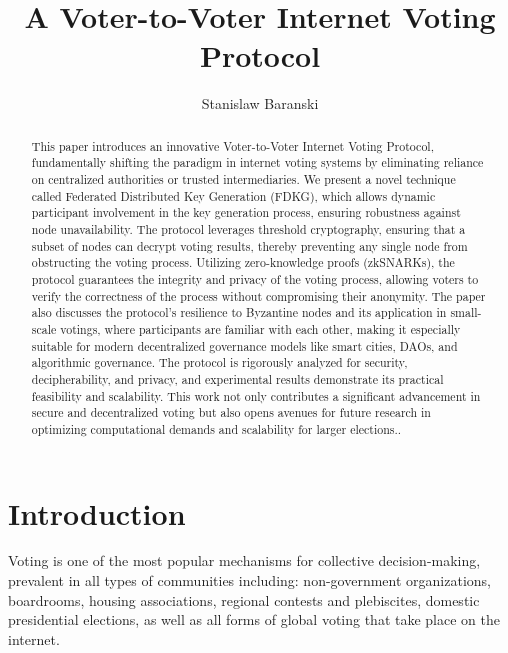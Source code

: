 \documentclass[runningheads]{llncs}
\title{A Voter-to-Voter Internet Voting Protocol}
\author{Stanislaw Baranski\inst{1}}
\institute{Gdansk University of Technology, Narutowicza 11/12 80-233, Gdansk, Poland \email{stanislaw.baranski@pg.edu.pl}}
\begin{document}
\maketitle


\begin{abstract}
This paper introduces an innovative Voter-to-Voter Internet Voting Protocol, fundamentally shifting the paradigm in internet voting systems by eliminating reliance on centralized authorities or trusted intermediaries. We present a novel technique called Federated Distributed Key Generation (FDKG), which allows dynamic participant involvement in the key generation process, ensuring robustness against node unavailability. The protocol leverages threshold cryptography, ensuring that a subset of nodes can decrypt voting results, thereby preventing any single node from obstructing the voting process. Utilizing zero-knowledge proofs (zkSNARKs), the protocol guarantees the integrity and privacy of the voting process, allowing voters to verify the correctness of the process without compromising their anonymity. The paper also discusses the protocol's resilience to Byzantine nodes and its application in small-scale votings, where participants are familiar with each other, making it especially suitable for modern decentralized governance models like smart cities, DAOs, and algorithmic governance. The protocol is rigorously analyzed for security, decipherability, and privacy, and experimental results demonstrate its practical feasibility and scalability. This work not only contributes a significant advancement in secure and decentralized voting but also opens avenues for future research in optimizing computational demands and scalability for larger elections..

\end{abstract}


\section{Introduction}
Voting is one of the most popular mechanisms for collective decision-making, prevalent in all types of communities including: non-government organizations, boardrooms, housing associations, regional contests and plebiscites, domestic presidential elections, as well as all forms of global voting that take place on the internet.
\end{document}
